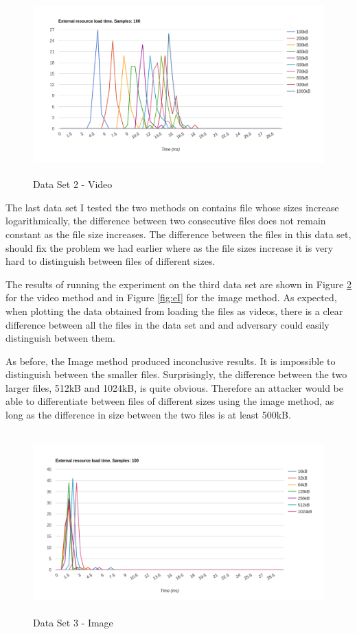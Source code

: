 \documentclass[10pt,a4paper,twoside]{book}
\begin{document}
\begin{figure}[h]
\centering
\includegraphics[width=\textwidth, height=7cm]{figures/v100L100.png}
\caption{Data Set 2 - Video}
\label{fig:l100I}
\end{figure}

The last data set I tested the two methods on contains file whose sizes increase logarithmically, the difference between two consecutive files does not remain constant as the file size increases. The difference between the files in this data set, should fix the problem we had earlier where as the file sizes increase it is very hard to distinguish between files of different sizes. 

The results of running the experiment on the third data set are shown in Figure \ref{fig:eV} for the video method and in Figure \ref{fig:eI} for the image method. As expected, when plotting the data obtained from loading the files as videos, there is a clear difference between all the files in the data set and and adversary could easily distinguish between them. 

As before, the Image method produced inconclusive results. It is impossible to distinguish between the smaller files. Surprisingly, the difference between the two larger files, 512kB and 1024kB, is quite obvious. Therefore an attacker would be able to differentiate between files of different sizes using the image method, as long as the difference in size between the two files is at least 500kB.

\begin{figure}[h]
\centering
\includegraphics[width=\textwidth, height=7cm]{figures/i100E.png}
\caption{Data Set 3 - Image}
\label{fig:eV}
\end{figure}
\end{document}
